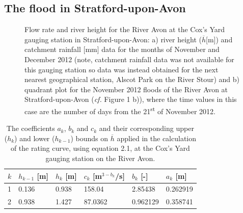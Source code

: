 \documentclass[11pt,a4paper]{article}
\begin{document}
\subsection{The flood in Stratford-upon-Avon}
\begin{figure}[H]
\centering
{}
\hfill
{}
\caption{Flow rate and river height for the River Avon at the Cox's Yard gauging station in Stratford-upon-Avon: a) river height ($\overline{h}$[m]) \cite{EA} and catchment rainfall [mm] data \cite{NRFA} for the months of November and December 2012 (note, catchment rainfall data was not available for this gauging station so data was instead obtained for the next nearest geographical station, Alscot Park on the River Stour) and b) quadrant plot for the November 2012 floods of the River Avon at Stratford-upon-Avon (\textit{cf.} Figure 1 b)), where the time values in this case are the number of days from the 21\textsuperscript{st} of November 2012.}
\end{figure}

\begin{table}[H]
\begin{tabular}{l|l|l|l|l|l}
$k$ & $h_{k-1}$ [m] & $h_k$ [m] & $c_k$ [m$^{3-b_k}$/s] & $b_k$ [-] & $a_k$ [m]\\
\hline
1 & 0.136 & 0.938 & 158.04 & 2.85438 & 0.262919 \\
2 & 0.938 & 1.427 & 87.0362 & 0.962129 & 0.358741 \\
\end{tabular}
\caption{The coefficients $a_k$, $b_k$ and $c_k$ and their corresponding upper ($h_k$) and lower ($h_{k-1}$) bounds on $\overline{h}$ \cite{EA} applied in the calculation of the rating curve, using equation 2.1, at the Cox's Yard gauging station on the River Avon.}
\end{table}
\end{document}
